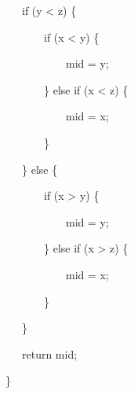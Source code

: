 \documentclass{article}
\newenvironment{tmindent}{\begin{tmparmod}{1.5em}{0pt}{0pt} }{\end{tmparmod}}
\newenvironment{tmparmod}[3]{\begin{list}{}{\setlength{\topsep}{0pt}\setlength{\leftmargin}{#1}\setlength{\rightmargin}{#2}\setlength{\parindent}{#3}\setlength{\listparindent}{\parindent}\setlength{\itemindent}{\parindent}\setlength{\parsep}{\parskip}} \item[]}{\end{list}}
\newenvironment{tmparsep}[1]{\begingroup\setlength{\parskip}{#1}}{\endgroup}
\begin{document}
\begin{example}
\begin{tmindent}
\begin{tmparsep}{0em}
      \ \ \ if (y < z) \{
      
      \ \ \ \ \ \ \ if (x < y) \{
      
      \ \ \ \ \ \ \ \ \ \ \ mid = y;
      
      \ \ \ \ \ \ \ \} else if (x < z) \{
      
      \ \ \ \ \ \ \ \ \ \ \ mid = x;
      
      \ \ \ \ \ \ \ \}
      
      \ \ \ \} else \{
      
      \ \ \ \ \ \ \ if (x > y) \{
      
      \ \ \ \ \ \ \ \ \ \ \ mid = y;
      
      \ \ \ \ \ \ \ \} else if (x > z) \{
      
      \ \ \ \ \ \ \ \ \ \ \ mid = x;
      
      \ \ \ \ \ \ \ \}
      
      \ \ \ \}
      
      \ \ \ return mid;
      
      \}
    \end{tmparsep}
  \end{tmindent}{\hspace*{\fill}}{\medskip}
\end{example}
\end{document}
